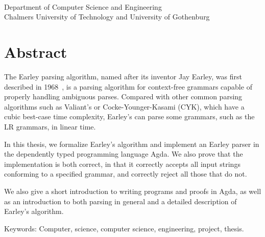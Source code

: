 \titleA{}\\
\titleB{}\\
\me{}\\
Department of Computer Science and Engineering\\
Chalmers University of Technology and University of Gothenburg
\vspace{0.5cm}

\thispagestyle{plain}			%
\vspace{0pt plus 1.0pt}
\section*{Abstract}

The Earley parsing algorithm, named after its inventor Jay Earley, was first
described in 1968~\cite{Earley}, is a parsing algorithm for context-free
grammars capable of properly handling ambiguous parses. Compared with other
common parsing algorithms such as Valiant's or Cocke-Younger-Kasami (CYK),
which have a cubic best-case time complexity, Earley's can parse some grammars,
such as the LR grammars, in linear time.

In this thesis, we formalize Earley's algorithm and implement an Earley parser
in the dependently typed programming language Agda.  We also prove that the
implementation is both correct, in that it correctly accepts all input strings
conforming to a specified grammar, and correctly reject all those that do not.

We also give a short introduction to writing programs and proofs in Agda, as
well as an introduction to both parsing in general and a detailed description
of Earley's algorithm.

\vfill
Keywords: Computer, science, computer science, engineering, project, thesis.

\newpage				%
\thispagestyle{empty}
\mbox{}
